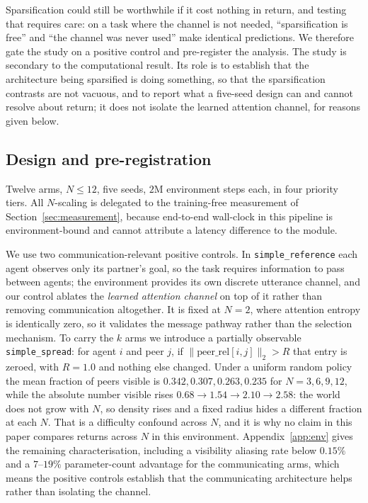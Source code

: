 Sparsification could still be worthwhile if it cost nothing in return, and
testing that requires care: on a task where the channel is not needed,
``sparsification is free'' and ``the channel was never used'' make identical
predictions. We therefore gate the study on a positive control and pre-register
the analysis. The study is secondary to the computational result. Its role is
to establish that the architecture being sparsified is doing something, so that
the sparsification contrasts are not vacuous, and to report what a five-seed
design can and cannot resolve about return; it does not isolate the learned
attention channel, for reasons given below.

\subsection{Design and pre-registration}

Twelve arms, $N \le 12$, five seeds, $2$M environment steps each, in four
priority tiers. All $N$-scaling is delegated to the training-free measurement
of Section~\ref{sec:measurement}, because end-to-end wall-clock in this
pipeline is environment-bound and cannot attribute a latency difference to the
module.

We use two communication-relevant positive controls. In
\texttt{simple\_reference} each
agent observes only its partner's goal, so the task requires information to
pass between agents; the environment provides its own discrete utterance
channel, and our control ablates the \emph{learned attention channel} on top of
it rather than removing communication altogether. It is fixed at $N{=}2$, where
attention entropy is identically zero, so it validates the message pathway
rather than the selection mechanism. To carry the $k$ arms we introduce a
partially observable \texttt{simple\_spread}: for agent $i$ and peer $j$, if
$\lVert \text{peer\_rel}[i,j]\rVert_2 > R$ that entry is zeroed, with $R{=}1.0$
and nothing else changed. Under a uniform random policy the mean fraction of
peers visible is $0.342, 0.307, 0.263, 0.235$ for $N = 3, 6, 9, 12$, while the
absolute number visible rises $0.68 \to 1.54 \to 2.10 \to 2.58$: the world does
not grow with $N$, so density rises and a fixed radius hides a different
fraction at each $N$. That is a difficulty confound across $N$, and it is why
no claim in this paper compares returns across $N$ in this environment.
Appendix~\ref{app:env} gives the remaining characterisation, including a
visibility aliasing rate below $0.15\%$ and a $7$--$19\%$ parameter-count
advantage for the communicating arms, which means the positive controls
establish that the communicating architecture helps rather than isolating the
channel.

